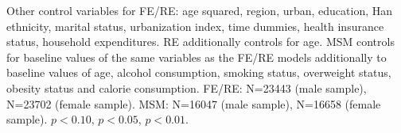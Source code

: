 \begin{table}[!ht]
\begin{adjustbox}{max width=\linewidth, center}
\begin{threeparttable}
{\begin{tablenotes}
Other control variables for FE/RE: age squared, region, urban, education, Han ethnicity, marital status, urbanization index, time dummies, health insurance status, household expenditures. RE additionally controls for age. MSM controls for baseline values of the same variables as the FE/RE models additionally to baseline values of age, alcohol consumption, smoking status, overweight status, obesity status and calorie consumption. FE/RE: N=23443 (male sample), N=23702 (female sample).   MSM: N=16047 (male sample), N=16658 (female sample). \sym{*} \(p<0.10\), \sym{**} \(p<0.05\), \sym{***} \(p<0.01\).
\end{tablenotes}
}
\end{threeparttable}
\end{adjustbox}
\end{table}

\clearpage

